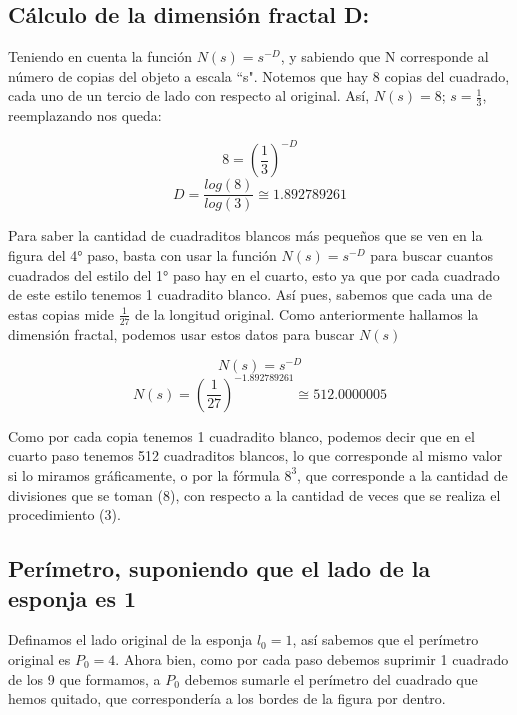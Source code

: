 \documentclass[12pt]{article}
\begin{document}
\subsection{Cálculo de la dimensión fractal D:}
Teniendo en cuenta la función $N(s)=s^{-D}$, y sabiendo que N corresponde al número de copias del objeto a escala ``s". Notemos que hay 8 copias del cuadrado, cada uno de un tercio de lado con respecto al original. Así, $N(s)=8$; $s=\frac{1}{3}$, reemplazando nos queda:

\begin{equation*}
    8=\left(\frac{1}{3}\right)^{-D}
\end{equation*}
\begin{equation*}
    D=\frac{log(8)}{log(3)}\cong1.892789261
\end{equation*}

Para saber la cantidad de cuadraditos blancos más pequeños que se ven en la figura del 4° paso, basta con usar la función $N(s)=s^{-D}$ para buscar cuantos cuadrados del estilo del 1° paso hay en el cuarto, esto ya que por cada cuadrado de este estilo tenemos 1 cuadradito blanco. Así pues, sabemos que cada una de estas copias mide $\frac{1}{27}$ de la longitud original. Como anteriormente hallamos la dimensión fractal, podemos usar estos datos para buscar $N(s)$

\begin{equation*}
    N(s)=s^{-D}
\end{equation*}
\begin{equation*}
    N(s)=\left(\frac{1}{27}\right)^{-1.892789261}\cong512.0000005
\end{equation*}

Como por cada copia tenemos 1 cuadradito blanco, podemos decir que en el cuarto paso tenemos 512 cuadraditos blancos, lo que corresponde al mismo valor si lo miramos gráficamente, o por la fórmula $8^3$, que corresponde a la cantidad de divisiones que se toman (8), con respecto a la cantidad de veces que se realiza el procedimiento (3).

\subsection{Perímetro, suponiendo que el lado de la esponja es 1}
Definamos el lado original de la esponja $l_0=1$, así sabemos que el perímetro original es $P_0=4$. Ahora bien, como por cada paso debemos suprimir 1 cuadrado de los 9 que formamos, a $P_0$ debemos sumarle el perímetro del cuadrado que hemos quitado, que correspondería a los bordes de la figura por dentro.
\end{document}

